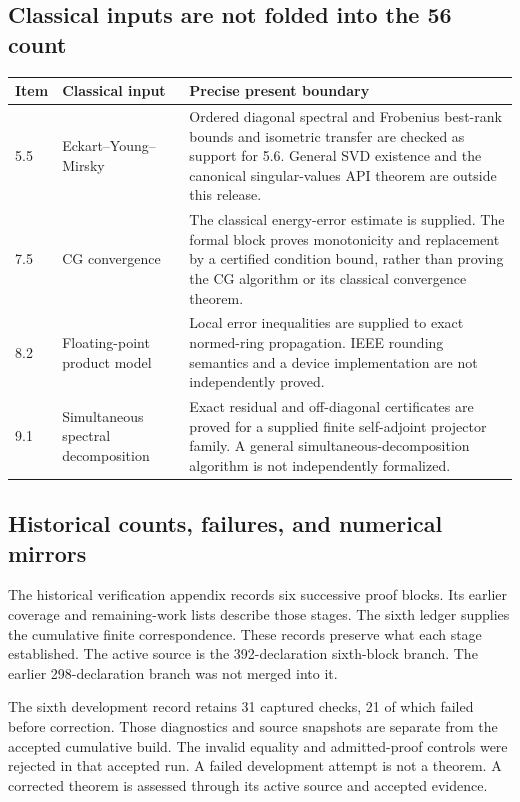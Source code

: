 \subsection{Classical inputs are not folded into the 56 count}
\begin{longtable}{@{}p{.16\linewidth}p{.27\linewidth}p{.50\linewidth}@{}}
\toprule Item & Classical input & Precise present boundary\\\midrule\endhead
5.5 & Eckart--Young--Mirsky & Ordered diagonal spectral and Frobenius best-rank bounds and isometric transfer are checked as support for 5.6. General SVD existence and the canonical singular-values API theorem are outside this release.\\
7.5 & CG convergence & The classical energy-error estimate is supplied. The formal block proves monotonicity and replacement by a certified condition bound, rather than proving the CG algorithm or its classical convergence theorem.\\
8.2 & Floating-point product model & Local error inequalities are supplied to exact normed-ring propagation. IEEE rounding semantics and a device implementation are not independently proved.\\
9.1 & Simultaneous spectral decomposition & Exact residual and off-diagonal certificates are proved for a supplied finite self-adjoint projector family. A general simultaneous-decomposition algorithm is not independently formalized.\\
\bottomrule\end{longtable}

\subsection{Historical counts, failures, and numerical mirrors}
The historical verification appendix records six successive proof blocks. Its earlier coverage and remaining-work lists describe those stages. The sixth ledger supplies the cumulative finite correspondence. These records preserve what each stage established. The active source is the 392-declaration sixth-block branch. The earlier 298-declaration branch was not merged into it.

The sixth development record retains 31 captured checks, 21 of which failed before correction. Those diagnostics and source snapshots are separate from the accepted cumulative build. The invalid equality and admitted-proof controls were rejected in that accepted run. A failed development attempt is not a theorem. A corrected theorem is assessed through its active source and accepted evidence.

